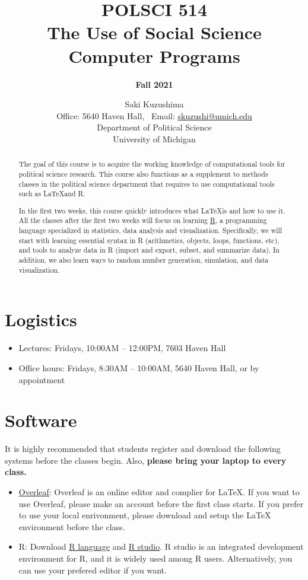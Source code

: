 \documentclass[11pt]{article}
\title{\bf POLSCI 514 \\ The Use of Social Science Computer Programs}
\author{\Large {\bf Fall 2021}}
\date{\large Saki Kuzushima \\ \medskip
  Office: 5640 Haven Hall, \ Email: \href{mailto:skuzushi@umich.edu}{skuzushi@umich.edu} \\ \medskip
  Department of Political Science \\ University of Michigan}
\begin{document}
\maketitle

\begin{abstract}
The goal of this course is to acquire the working knowledge of computational tools for political science research.
This course also functions as a supplement to methods classes in the political science department that requires to use computational tools such as \LaTeX and R.

In the first two weeks, this course quickly introduces what \LaTeX is and how to use it. 
All the classes after the first two weeks will focus on learning \href{https://www.r-proect.org/}{R}, a programming language specialized in statistics, data analysis and visualization.
Specifically, we will start with learning essential syntax in R (arithmetics, objects, loops, functions, etc), and tools to analyze data in R (import and export, subset, and summarize data).
In addition, we also learn ways to random number generation, simulation, and data visualization. 
\end{abstract}


\section{Logistics}

\begin{itemize}
\item Lectures: Fridays, 10:00AM -- 12:00PM, 7603 Haven Hall
\item Office hours: Fridays, 8:30AM -- 10:00AM, 5640 Haven Hall, or by appointment
\end{itemize}


\section{Software}

It is highly recommended that students register and download the following systems before the classes begin.
Also, \textbf{please bring your laptop to every class.}

\begin{itemize}
\item \href{https://www.overleaf.com/}{Overleaf}: Overleaf is an online editor and complier for \LaTeX. 
If you want to use Overleaf, please make an account before the first class starts.
If you prefer to use your local enrivonment, please download and setup the LaTeX environment before the class.

\item R: Download \href{https://www.r-project.org/}{R language} and \href{https://www.rstudio.com/}{R studio}. 
R studio is an integrated development environment for R, and it is widely used among R users.
Alternatively, you can use your prefered editor if you want.


\end{itemize} 
\end{document}
